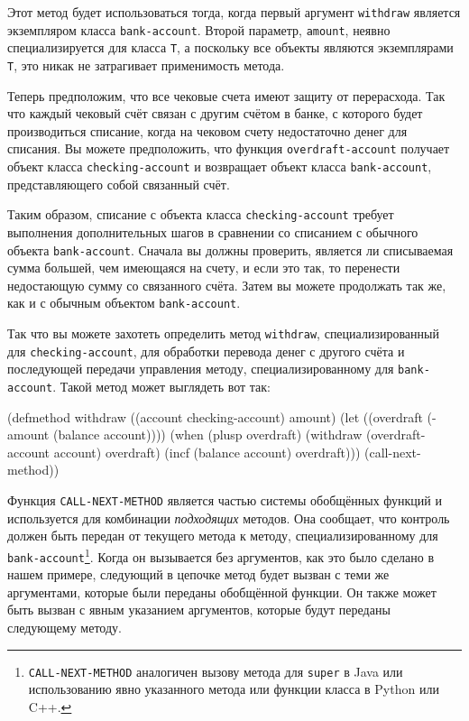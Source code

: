 Этот метод будет использоваться тогда, когда первый аргумент \lstinline{withdraw} является
экземпляром класса \lstinline{bank-account}.  Второй параметр, \lstinline{amount}, неявно
специализируется для класса \lstinline{T}, а поскольку все объекты являются экземплярами
\lstinline{T}, это никак не затрагивает применимость метода.

Теперь предположим, что все чековые счета имеют защиту от перерасхода.  Так что каждый
чековый счёт связан с другим счётом в банке, с которого будет производиться списание,
когда на чековом счету недостаточно денег для списания.  Вы можете предположить, что
функция \lstinline{overdraft-account} получает объект класса \lstinline{checking-account} и
возвращает объект класса \lstinline{bank-account}, представляющего собой связанный счёт.

Таким образом, списание с объекта класса \lstinline{checking-account} требует выполнения
дополнительных шагов в сравнении со списанием с обычного объекта \lstinline{bank-account}.
Сначала вы должны проверить, является ли списываемая сумма большей, чем имеющаяся на
счету, и если это так, то перенести недостающую сумму со связанного счёта.  Затем вы
можете продолжать так же, как и с обычным объектом \lstinline{bank-account}.

Так что вы можете захотеть определить метод \lstinline{withdraw}, специализированный для
\lstinline{checking-account}, для обработки перевода денег с другого счёта и последующей
передачи управления методу, специализированному для \lstinline{bank-account}.  Такой метод
может выглядеть вот так:

\begin{myverb}
(defmethod withdraw ((account checking-account) amount)
  (let ((overdraft (- amount (balance account))))
    (when (plusp overdraft)
      (withdraw (overdraft-account account) overdraft)
      (incf (balance account) overdraft)))
  (call-next-method))
\end{myverb}

Функция \lstinline{CALL-NEXT-METHOD} является частью системы обобщённых функций и используется
для комбинации \textit{подходящих} методов.  Она сообщает, что контроль должен быть
передан от текущего метода к методу, специализированному для
\lstinline{bank-account}\footnote{\lstinline{CALL-NEXT-METHOD} аналогичен вызову метода для
  \lstinline{super} в Java или использованию явно указанного метода или функции класса в Python
  или C++.}\hspace{\footnotenegspace}.  Когда он вызывается без аргументов, как это было сделано в нашем примере,
следующий в цепочке метод будет вызван с теми же аргументами, которые были переданы
обобщённой функции.  Он также может быть вызван с явным указанием аргументов, которые
будут переданы следующему методу.

